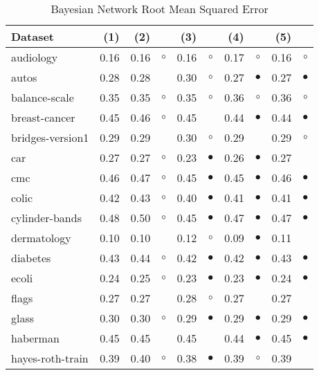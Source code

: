 \newpage
{\centering \footnotesize \begin{longtable}{lrr@{\hspace{0.1cm}}cr@{\hspace{0.1cm}}cr@{\hspace{0.1cm}}cr@{\hspace{0.1cm}}c}
\caption{\label{bnrmse}Bayesian Network Root Mean Squared Error}
\\
\hline
Dataset & (1)& (2) & & (3) & & (4) & & (5) & \\
\hline
audiology & 0.16 & 0.16 &   $\circ$ & 0.16 &   $\circ$ & 0.17 &   $\circ$ & 0.16 &    $\circ$\\
autos & 0.28 & 0.28 &           & 0.30 &   $\circ$ & 0.27 & $\bullet$ & 0.27 &  $\bullet$\\
balance-scale & 0.35 & 0.35 &   $\circ$ & 0.35 &   $\circ$ & 0.36 &   $\circ$ & 0.36 &    $\circ$\\
breast-cancer & 0.45 & 0.46 &   $\circ$ & 0.45 &           & 0.44 & $\bullet$ & 0.44 &  $\bullet$\\
bridges-version1 & 0.29 & 0.29 &           & 0.30 &   $\circ$ & 0.29 &           & 0.29 &    $\circ$\\
car & 0.27 & 0.27 &   $\circ$ & 0.23 & $\bullet$ & 0.26 & $\bullet$ & 0.27 &           \\
cmc & 0.46 & 0.47 &   $\circ$ & 0.45 & $\bullet$ & 0.45 & $\bullet$ & 0.46 &  $\bullet$\\
colic & 0.42 & 0.43 &   $\circ$ & 0.40 & $\bullet$ & 0.41 & $\bullet$ & 0.41 &  $\bullet$\\
cylinder-bands & 0.48 & 0.50 &   $\circ$ & 0.45 & $\bullet$ & 0.47 & $\bullet$ & 0.47 &  $\bullet$\\
dermatology & 0.10 & 0.10 &           & 0.12 &   $\circ$ & 0.09 & $\bullet$ & 0.11 &           \\
diabetes & 0.43 & 0.44 &   $\circ$ & 0.42 & $\bullet$ & 0.42 & $\bullet$ & 0.43 &  $\bullet$\\
ecoli & 0.24 & 0.25 &   $\circ$ & 0.23 & $\bullet$ & 0.23 & $\bullet$ & 0.24 &  $\bullet$\\
flags & 0.27 & 0.27 &           & 0.28 &   $\circ$ & 0.27 &           & 0.27 &           \\
glass & 0.30 & 0.30 &   $\circ$ & 0.29 & $\bullet$ & 0.29 & $\bullet$ & 0.29 &  $\bullet$\\
haberman & 0.45 & 0.45 &           & 0.45 &           & 0.44 & $\bullet$ & 0.45 &  $\bullet$\\
hayes-roth-train & 0.39 & 0.40 &   $\circ$ & 0.38 & $\bullet$ & 0.39 &   $\circ$ & 0.39 &           \\

\end{longtable}}
